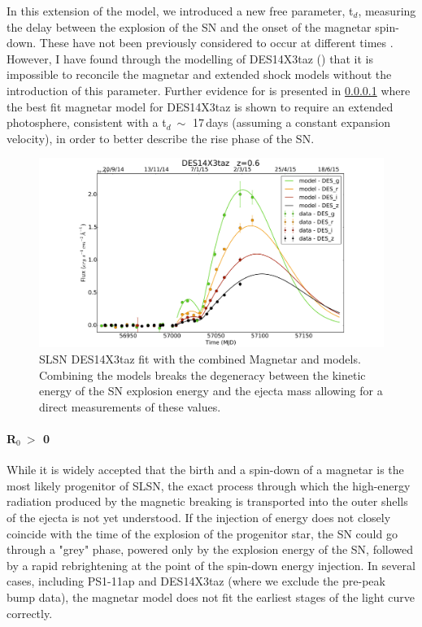 In this extension of the model, we introduced a new free parameter, t$_d$, measuring the delay between the explosion of the SN and the onset of the magnetar spin-down. These have not been previously considered to occur at different times \citep{Nicoll2016}. However, I have found through the modelling of DES14X3taz () that it is impossible to reconcile the magnetar and extended shock models without the introduction of this parameter. Further evidence for is presented in \cref{par:R0nonzero} where the best fit magnetar model for DES14X3taz is shown to require an extended photosphere, consistent with a t$_d ~\sim$ 17\,days (assuming a constant expansion velocity), in order to better describe the rise phase of the SN.

\begin{figure}
  \centering
  \includegraphics[width=\textwidth]{Figures/Chapter4/DES14X3taz.png}
  \caption{SLSN DES14X3taz fit with the combined Magnetar and \citet{Piro2015} models. Combining the models breaks the degeneracy between the kinetic energy of the SN explosion energy and the ejecta mass allowing for a direct measurements of these values.}
  \label{fig:PiroMagnetar}
\end{figure}

\paragraph{R$_0~>$ 0}
\label{par:R0nonzero}
While it is widely accepted that the birth and a spin-down of a magnetar is the most likely progenitor of SLSN, the exact process through which the high-energy radiation produced by the magnetic breaking is transported into the outer shells of the ejecta is not yet understood. If the injection of energy does not closely coincide with the time of the explosion of the progenitor star, the SN could go through a "grey" phase, powered only by the explosion energy of the SN, followed by a rapid rebrightening at the point of the spin-down energy injection. In several cases, including PS1-11ap and DES14X3taz (where we exclude the pre-peak bump data), the magnetar model does not fit the earliest stages of the light curve correctly.

